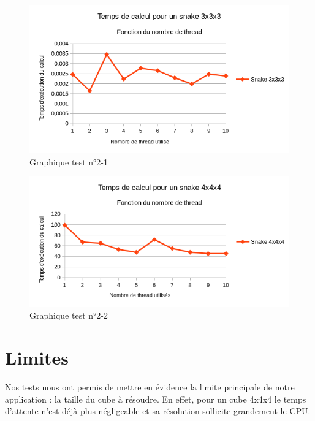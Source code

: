 \begin{figure}[h]
 \centering
 \includegraphics[scale=0.7,keepaspectratio=true]{img/test2-1.png}
 \caption{Graphique test n°2-1}
\end{figure}

\begin{figure}[h]
 \centering
 \includegraphics[scale=0.7,keepaspectratio=true]{img/test2-2.png}
 \caption{Graphique test n°2-2}
\end{figure}

\section{Limites}
Nos tests nous ont permis de mettre en évidence la limite principale de notre application : la taille du cube à résoudre. En effet, pour un cube 4x4x4 le temps d'attente n'est déjà plus négligeable et sa résolution sollicite grandement le CPU.
